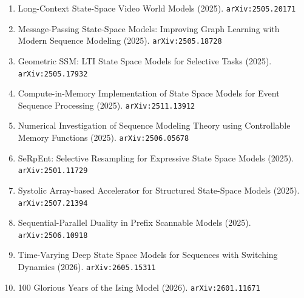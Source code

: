 \documentclass[11pt]{article}
\begin{document}
\begin{enumerate}
  \item Long-Context State-Space Video World Models (2025). \texttt{arXiv:2505.20171}
  \item Message-Passing State-Space Models: Improving Graph Learning with Modern Sequence Modeling (2025). \texttt{arXiv:2505.18728}
  \item Geometric SSM: LTI State Space Models for Selective Tasks (2025). \texttt{arXiv:2505.17932}
  \item Compute-in-Memory Implementation of State Space Models for Event Sequence Processing (2025). \texttt{arXiv:2511.13912}
  \item Numerical Investigation of Sequence Modeling Theory using Controllable Memory Functions (2025). \texttt{arXiv:2506.05678}
  \item SeRpEnt: Selective Resampling for Expressive State Space Models (2025). \texttt{arXiv:2501.11729}
  \item Systolic Array-based Accelerator for Structured State-Space Models (2025). \texttt{arXiv:2507.21394}
  \item Sequential-Parallel Duality in Prefix Scannable Models (2025). \texttt{arXiv:2506.10918}
  \item Time-Varying Deep State Space Models for Sequences with Switching Dynamics (2026). \texttt{arXiv:2605.15311}
  \item 100 Glorious Years of the Ising Model (2026). \texttt{arXiv:2601.11671}
\end{enumerate}
\end{document}
